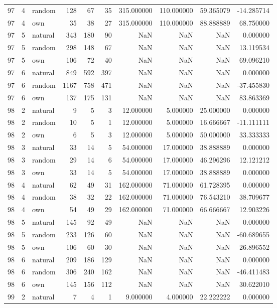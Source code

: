 \begin{table}[htbp]
\begin{tabular}{rrlrrrrrrr}
97 & 4 & random & 128 & 67 & 35 & 315.000000 & 110.000000 & 59.365079 & -14.285714 \\
97 & 4 & own & 35 & 38 & 27 & 315.000000 & 110.000000 & 88.888889 & 68.750000 \\
97 & 5 & natural & 343 & 180 & 90 & NaN & NaN & NaN & 0.000000 \\
97 & 5 & random & 298 & 148 & 67 & NaN & NaN & NaN & 13.119534 \\
97 & 5 & own & 106 & 72 & 40 & NaN & NaN & NaN & 69.096210 \\
97 & 6 & natural & 849 & 592 & 397 & NaN & NaN & NaN & 0.000000 \\
97 & 6 & random & 1167 & 758 & 471 & NaN & NaN & NaN & -37.455830 \\
97 & 6 & own & 137 & 175 & 131 & NaN & NaN & NaN & 83.863369 \\
98 & 2 & natural & 9 & 5 & 3 & 12.000000 & 5.000000 & 25.000000 & 0.000000 \\
98 & 2 & random & 10 & 5 & 1 & 12.000000 & 5.000000 & 16.666667 & -11.111111 \\
98 & 2 & own & 6 & 5 & 3 & 12.000000 & 5.000000 & 50.000000 & 33.333333 \\
98 & 3 & natural & 33 & 14 & 5 & 54.000000 & 17.000000 & 38.888889 & 0.000000 \\
98 & 3 & random & 29 & 14 & 6 & 54.000000 & 17.000000 & 46.296296 & 12.121212 \\
98 & 3 & own & 33 & 14 & 5 & 54.000000 & 17.000000 & 38.888889 & 0.000000 \\
98 & 4 & natural & 62 & 49 & 31 & 162.000000 & 71.000000 & 61.728395 & 0.000000 \\
98 & 4 & random & 38 & 32 & 22 & 162.000000 & 71.000000 & 76.543210 & 38.709677 \\
98 & 4 & own & 54 & 49 & 29 & 162.000000 & 71.000000 & 66.666667 & 12.903226 \\
98 & 5 & natural & 145 & 92 & 49 & NaN & NaN & NaN & 0.000000 \\
98 & 5 & random & 233 & 126 & 60 & NaN & NaN & NaN & -60.689655 \\
98 & 5 & own & 106 & 60 & 30 & NaN & NaN & NaN & 26.896552 \\
98 & 6 & natural & 209 & 186 & 129 & NaN & NaN & NaN & 0.000000 \\
98 & 6 & random & 306 & 240 & 162 & NaN & NaN & NaN & -46.411483 \\
98 & 6 & own & 145 & 156 & 112 & NaN & NaN & NaN & 30.622010 \\
99 & 2 & natural & 7 & 4 & 1 & 9.000000 & 4.000000 & 22.222222 & 0.000000 \\

\end{tabular}
\end{table}
